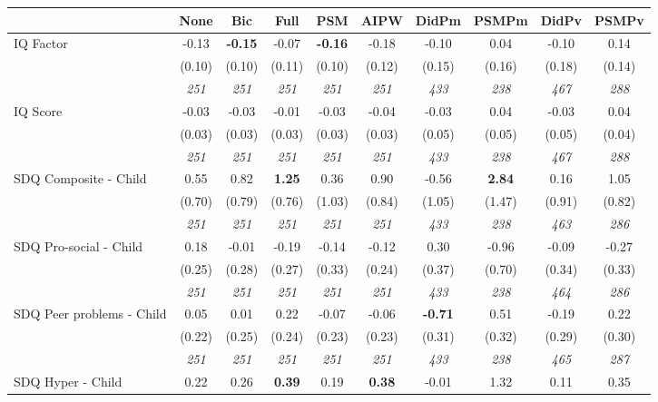 \begin{tabular}{l c c c c c c c c c}
\toprule
 & None & Bic & Full & PSM & AIPW & DidPm & PSMPm & DidPv & PSMPv \\
\midrule
IQ Factor & -0.13 & \textbf{ -0.15 } & -0.07 & \textbf{-0.16} & -0.18 & -0.10 & 0.04 & -0.10 & 0.14 \\
& (0.10) & (0.10) & (0.11) & (0.10) & (0.12) & (0.15) & (0.16) & (0.18) & (0.14) \\
& \textit{ 251 } & \textit{ 251 } & \textit{ 251 } & \textit{ 251 } & \textit{ 251 } & \textit{ 433 } & \textit{ 238 } & \textit{ 467 } & \textit{ 288 } \\
IQ Score & -0.03 & -0.03 & -0.01 & -0.03 & -0.04 & -0.03 & 0.04 & -0.03 & 0.04 \\
& (0.03) & (0.03) & (0.03) & (0.03) & (0.03) & (0.05) & (0.05) & (0.05) & (0.04) \\
& \textit{ 251 } & \textit{ 251 } & \textit{ 251 } & \textit{ 251 } & \textit{ 251 } & \textit{ 433 } & \textit{ 238 } & \textit{ 467 } & \textit{ 288 } \\
SDQ Composite - Child & 0.55 & 0.82 & \textbf{ 1.25 } & 0.36 & 0.90 & -0.56 & \textbf{2.84} & 0.16 & 1.05 \\
& (0.70) & (0.79) & (0.76) & (1.03) & (0.84) & (1.05) & (1.47) & (0.91) & (0.82) \\
& \textit{ 251 } & \textit{ 251 } & \textit{ 251 } & \textit{ 251 } & \textit{ 251 } & \textit{ 433 } & \textit{ 238 } & \textit{ 463 } & \textit{ 286 } \\
SDQ Pro-social - Child & 0.18 & -0.01 & -0.19 & -0.14 & -0.12 & 0.30 & -0.96 & -0.09 & -0.27 \\
& (0.25) & (0.28) & (0.27) & (0.33) & (0.24) & (0.37) & (0.70) & (0.34) & (0.33) \\
& \textit{ 251 } & \textit{ 251 } & \textit{ 251 } & \textit{ 251 } & \textit{ 251 } & \textit{ 433 } & \textit{ 238 } & \textit{ 464 } & \textit{ 286 } \\
SDQ Peer problems - Child & 0.05 & 0.01 & 0.22 & -0.07 & -0.06 & \textbf{ -0.71 } & 0.51 & -0.19 & 0.22 \\
& (0.22) & (0.25) & (0.24) & (0.23) & (0.23) & (0.31) & (0.32) & (0.29) & (0.30) \\
& \textit{ 251 } & \textit{ 251 } & \textit{ 251 } & \textit{ 251 } & \textit{ 251 } & \textit{ 433 } & \textit{ 238 } & \textit{ 465 } & \textit{ 287 } \\
SDQ Hyper - Child & 0.22 & 0.26 & \textbf{ 0.39 } & 0.19 & \textbf{0.38} & -0.01 & 1.32 & 0.11 & 0.35 \\

\end{tabular}
